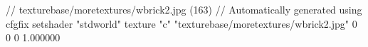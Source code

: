 // texturebase/moretextures/wbrick2.jpg (163)
// Automatically generated using cfgfix
setshader "stdworld"
texture "c" "texturebase/moretextures/wbrick2.jpg" 0 0 0 1.000000
